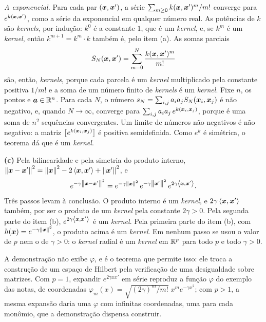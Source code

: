 \begin{solucao}
\emph{A exponencial.} Para cada par $(\bm{x},\bm{x}')$, a série $\sum_{m\ge0}k(\bm{x},\bm{x}')^m/m!$ converge
para $e^{k(\bm{x},\bm{x}')}$, como a série da exponencial em qualquer número real. As potências de $k$
são \emph{kernels}, por indução: $k^0$ é a constante $1$, que é um \emph{kernel}, e, se $k^m$ é
um \emph{kernel}, então $k^{m+1}=k^m\cdot k$ também é, pelo item (a). As somas parciais
\[
  S_N(\bm{x},\bm{x}')=\sum_{m=0}^N\frac{k(\bm{x},\bm{x}')^m}{m!}
\]
são, então, \emph{kernels}, porque cada parcela é um \emph{kernel} multiplicado pela constante
positiva $1/m!$ e a soma de um número finito de \emph{kernels} é um \emph{kernel}. Fixe $n$, os
pontos e $\bm a\in\mathbb{R}^n$. Para cada $N$, o número $s_N=\sum_{i,j}a_ia_jS_N(\bm{x}_i,\bm{x}_j)$ é não
negativo, e, quando $N\to\infty$, converge para $\sum_{i,j}a_ia_j\,e^{k(\bm{x}_i,\bm{x}_j)}$, porque é
uma soma de $n^2$ sequências convergentes. Um limite de números não negativos é não negativo:
a matriz $\big[e^{k(\bm{x}_i,\bm{x}_j)}\big]$ é positiva semidefinida. Como $e^{k}$ é simétrica, o
teorema dá que é um \emph{kernel}.

\smallskip
\textbf{(c)} Pela bilinearidade e pela simetria do produto interno,
$\left\lVert \bm{x}-\bm{x}' \right\rVert^2=\left\lVert \bm{x} \right\rVert^2-2\left\langle \bm{x}, \bm{x}' \right\rangle+\left\lVert \bm{x}' \right\rVert^2$, e
\[
  e^{-\gamma\left\lVert \bm{x}-\bm{x}' \right\rVert^2}
  =e^{-\gamma\left\lVert \bm{x} \right\rVert^2}\,e^{-\gamma\left\lVert \bm{x}' \right\rVert^2}\,e^{2\gamma\left\langle \bm{x}, \bm{x}' \right\rangle} .
\]
Três passos levam à conclusão. O produto interno é um \emph{kernel}, e $2\gamma\left\langle \bm{x}, \bm{x}' \right\rangle$
também, por ser o produto de um \emph{kernel} pela constante $2\gamma>0$. Pela segunda parte do
item (b), $e^{2\gamma\left\langle \bm{x}, \bm{x}' \right\rangle}$ é um \emph{kernel}. Pela primeira parte do item (b), com
$h(\bm{x})=e^{-\gamma\left\lVert \bm{x} \right\rVert^2}$, o produto acima é um \emph{kernel}. Em nenhum passo se usou o
valor de $p$ nem o de $\gamma>0$: o \emph{kernel} radial é um \emph{kernel} em $\mathbb{R}^p$ para todo
$p$ e todo $\gamma>0$.

A demonstração não exibe $\varphi$, e é o teorema que permite isso: ele troca a construção de um
espaço de Hilbert pela verificação de uma desigualdade sobre matrizes. Com $p=1$, expandir
$e^{2\gamma xx'}$ em série reproduz a função $\varphi$ do exemplo das notas, de coordenadas
$\varphi_m(x)=\sqrt{(2\gamma)^m/m!}\;x^me^{-\gamma x^2}$; com $p>1$, a mesma expansão daria uma
$\varphi$ com infinitas coordenadas, uma para cada monômio, que a demonstração dispensa
construir.
\end{solucao}
